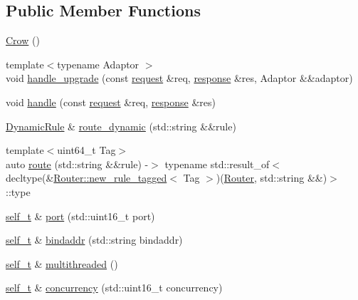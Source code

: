 \subsection*{Public Member Functions}
\begin{DoxyCompactItemize}
\item 
\hyperlink{classcrow_1_1_crow_a7a6ce30b00d6d2beb901ffbb3160c137}{Crow} ()
\item 
{\footnotesize template$<$typename Adaptor $>$ }\\void \hyperlink{classcrow_1_1_crow_a6e435bf5275735effd32647772bdbd04}{handle\-\_\-upgrade} (const \hyperlink{structcrow_1_1request}{request} \&req, \hyperlink{structcrow_1_1response}{response} \&res, Adaptor \&\&adaptor)
\item 
void \hyperlink{classcrow_1_1_crow_a9e0d9a96cd8be5374758f538cc057f26}{handle} (const \hyperlink{structcrow_1_1request}{request} \&req, \hyperlink{structcrow_1_1response}{response} \&res)
\item 
\hyperlink{classcrow_1_1_dynamic_rule}{Dynamic\-Rule} \& \hyperlink{classcrow_1_1_crow_a0f408e47d261ad55ccfd8eb5f351c22e}{route\-\_\-dynamic} (std\-::string \&\&rule)
\item 
{\footnotesize template$<$uint64\-\_\-t Tag$>$ }\\auto \hyperlink{classcrow_1_1_crow_af221cb25926e5dabc2da21a7a1c9713c}{route} (std\-::string \&\&rule) -\/$>$ typename std\-::result\-\_\-of$<$ decltype(\&\hyperlink{classcrow_1_1_router_a7e20f1e99321ad71db0eb936d2fb267e}{Router\-::new\-\_\-rule\-\_\-tagged}$<$ Tag $>$)(\hyperlink{classcrow_1_1_router}{Router}, std\-::string \&\&)$>$\-::type
\item 
\hyperlink{classcrow_1_1_crow_a5b0a203a6f9070ea8010227dcdbcec60}{self\-\_\-t} \& \hyperlink{classcrow_1_1_crow_a365f9c95fc2bd8bb583967f499c1f4a1}{port} (std\-::uint16\-\_\-t port)
\item 
\hyperlink{classcrow_1_1_crow_a5b0a203a6f9070ea8010227dcdbcec60}{self\-\_\-t} \& \hyperlink{classcrow_1_1_crow_a75777f82b6519c86d71446eb9285d774}{bindaddr} (std\-::string bindaddr)
\item 
\hyperlink{classcrow_1_1_crow_a5b0a203a6f9070ea8010227dcdbcec60}{self\-\_\-t} \& \hyperlink{classcrow_1_1_crow_a0149b20b7f6c0123292286f54638d456}{multithreaded} ()
\item 
\hyperlink{classcrow_1_1_crow_a5b0a203a6f9070ea8010227dcdbcec60}{self\-\_\-t} \& \hyperlink{classcrow_1_1_crow_a41686e6025705c1ab379b5ec71bbf983}{concurrency} (std\-::uint16\-\_\-t concurrency)
\item 

\end{DoxyCompactItemize}
